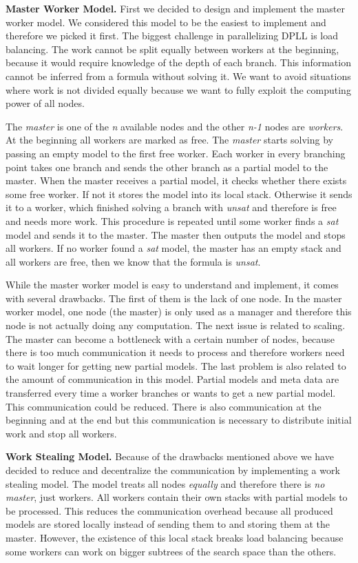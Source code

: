 \documentclass[letterpaper]{article}
\newcommand{\mypar}[1]{{\bf #1.}}
\begin{document}
\mypar{Master Worker Model}
First we decided to design and implement the master worker model.
We considered this model to be the easiest to implement and therefore we picked it first.
The biggest challenge in parallelizing DPLL is load balancing.
The work cannot be split equally between workers at the beginning, because it would require knowledge of the depth of each branch.
This information cannot be inferred from a formula without solving it.
We want to avoid situations where work is not divided equally because we want to fully exploit the computing power of all nodes.

The \textit{master} is one of the \textit{n} available nodes and the other \textit{n-1} nodes are \textit{workers}.
At the beginning all workers are marked as free.
The \textit{master} starts solving by passing an empty model to the first free worker.
Each worker in every branching point takes one branch and sends the other branch as a partial model to the master.
When the master receives a partial model, it checks whether there exists some free worker.
If not it stores the model into its local stack.
Otherwise it sends it to a worker, which finished solving a branch with \textit{unsat} and therefore is free and needs more work.
This procedure is repeated until some worker finds a \textit{sat} model and sends it to the master.
The master then outputs the model and stops all workers.
If no worker found a \textit{sat} model, the master has an empty stack and all workers are free, then we know that the formula is \textit{unsat}.

While the master worker model is easy to understand and implement, it comes with several drawbacks.
The first of them is the lack of one node.
In the master worker model, one node (the master) is only used as a manager and therefore this node is not actually doing any computation.
The next issue is related to scaling.
The master can become a bottleneck with a certain number of nodes, because there is too much communication it needs to process and therefore workers need to wait longer for getting new partial models.
The last problem is also related to the amount of communication in this model.
Partial models and meta data are transferred every time a worker branches or wants to get a new partial model.
This communication could be reduced.
There is also communication at the beginning and at the end but this communication is necessary to distribute initial work and stop all workers.

\mypar{Work Stealing Model}
Because of the drawbacks mentioned above we have decided to reduce and decentralize the communication by implementing a work stealing model.
The model treats all nodes \textit{equally} and therefore there is \textit{no master}, just workers.
All workers contain their own stacks with partial models to be processed.
This reduces the communication overhead because all produced models are stored locally instead of sending them to and storing them at the master.
However, the existence of this local stack breaks load balancing because some workers can work on bigger subtrees of the search space than the others.
\end{document}
